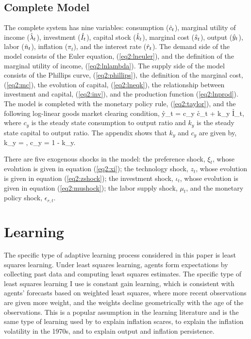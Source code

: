 \subsection{Complete Model}
The complete system has nine variables: consumption ($\hat{c}_t$), marginal utility of income ($\hat{\lambda}_t$), investment ($\hat{I}_t$), capital stock ($\hat{k}_t$), marginal cost ($\hat{s}_t$), output ($\hat{y}_t$), labor ($\hat{n}_t$), inflation ($\pi_t$), and the interest rate ($\hat{r}_t$).   The demand side of the model consists of the Euler equation, (\ref{eq2:lneuler}), and the definition of the marginal utility of income, (\ref{eq2:lnlambda}).  The supply side of the model consists of the Phillips curve, (\ref{eq2:phillips}), the definition of the marginal cost, (\ref{eq2:mc}), the evolution of capital, (\ref{eq2:lneqk}), the relationship between investment and capital, (\ref{eq2:inv}), and the production function (\ref{eq2:lnprod}).  The model is completed with the monetary policy rule, (\ref{eq2:taylor}), and the following log-linear goods market clearing condition,
\beq \label{eq2:lnmkt} \h{y}_t = c_y \h{c}_t + \delta k_y \h{I}_t, \eeq
where $c_y$ is the steady state consumption to output ratio and $k_y$ is the steady state capital to output ratio.  The appendix shows that $k_y$ and $c_y$ are given by,
\bdm k_y = , \edm
\bdm c_y = 1 - \delta k_y. \edm

There are five exogenous shocks in the model: the preference shock, $\xi_t$, whose evolution is given in equation (\ref{eq2:xi}); the technology shock, $z_t$, whose evolution is given in equation (\ref{eq2:zshock}); the investment shock, $\iota_t$, whose evolution is given in equation (\ref{eq2:mushock}); the labor supply shock, $\mu_t$, and the monetary policy shock, $\epsilon_{r,t}$.   

\section{Learning}

The specific type of adaptive learning process considered in this paper is least squares learning.  Under least squares learning, agents form expectations by collecting past data and computing least squares estimates.  The specific type of least squares learning I use is constant gain learning, which is consistent with agents' forecasts based on weighted least squares, where more recent observations are given more weight, and the weights decline geometrically with the age of the observations.  This is a popular assumption in the learning literature and is the same type of learning used by  to explain inflation scares,  to explain the inflation volatility in the 1970s, and  to explain output and inflation persistence.  

